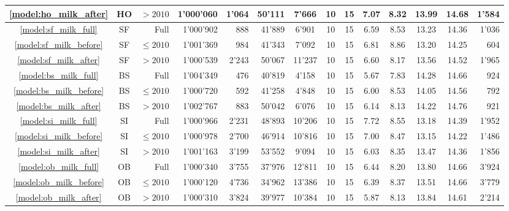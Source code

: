 \begin{landscape}
\begin{table}[H]
\begin{tabular}{c c r r r r c c c c c c c r}
            \textcolor{blue}{\ref{model:ho_milk_after}}& HO & $>2010$ & 1'000'060 & 1'064 & 50'111 & 7'666 & 10 & 15 & 7.07 & 8.32 & 13.99 & 14.68 & 1'584\\
            \hline
            \textcolor{blue}{\ref{model:sf_milk_full}}& SF & Full & 1'000'902 & 888 & 41'889 & 6'901 & 10 & 15 & 6.59 & 8.53 & 13.23 & 14.36 & 1'036\\
            \textcolor{blue}{\ref{model:sf_milk_before}}& SF & $\leq2010$ & 1'001'369 & 984 & 41'343 & 7'092 & 10 & 15 & 6.81 & 8.86 & 13.20 & 14.25 & 604\\
            \textcolor{blue}{\ref{model:sf_milk_after}}& SF & $>2010$ & 1'000'539 & 2'243 & 50'067 & 11'237 & 10 & 15 & 6.60 & 8.17 & 13.56 & 14.52 & 1'965\\
            \hline
            \textcolor{blue}{\ref{model:bs_milk_full}}& BS & Full & 1'004'349 & 476 & 40'819 & 4'158 & 10 & 15 & 5.67 & 7.83 & 14.28 & 14.66 & 924\\
            \textcolor{blue}{\ref{model:bs_milk_before}}& BS & $\leq2010$ & 1'000'720 & 592 & 41'258 & 4'848 & 10 & 15 & 6.00 & 8.53 & 14.05 & 14.56 & 792\\
            \textcolor{blue}{\ref{model:bs_milk_after}}& BS & $>2010$ & 1'002'767 & 883 & 50'042 & 6'076 & 10 & 15 & 6.14 & 8.13 & 14.22 & 14.76 & 921\\
            \hline
            \textcolor{blue}{\ref{model:si_milk_full}}& SI & Full & 1'000'966 & 2'231 & 48'893 & 10'206 & 10 & 15 & 7.72 & 8.55 & 13.18 & 14.39 & 1'952\\
            \textcolor{blue}{\ref{model:si_milk_before}}& SI & $\leq2010$ & 1'000'978 & 2'700 & 46'914 & 10'816 & 10 & 15 & 7.00 & 8.47 & 13.15 & 14.22 & 1'486\\
            \textcolor{blue}{\ref{model:si_milk_after}}& SI & $>2010$ & 1'001'163 & 3'199 & 53'552 & 9'094 & 10 & 15 & 6.03 & 8.35 & 13.47 & 14.36 & 1'856\\
            \hline
            \textcolor{blue}{\ref{model:ob_milk_full}}& OB & Full & 1'000'340 & 3'755 & 37'976 & 12'811 & 10 & 15 & 6.44 & 8.20 & 13.80 & 14.66 & 3'924\\
            \textcolor{blue}{\ref{model:ob_milk_before}}& OB & $\leq2010$ & 1'000'120 & 4'736 & 34'962 & 13'386 & 10 & 15 & 6.39 & 8.37 & 13.51 & 14.66 & 3'779\\
            \textcolor{blue}{\ref{model:ob_milk_after}}& OB & $>2010$ & 1'000'310 & 3'824 & 39'977 & 10'384 & 10 & 15 & 5.87 & 8.13 & 13.84 & 14.61 & 2'214\\

\end{tabular}
\end{table}
\end{landscape}
